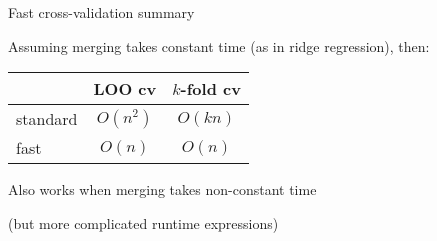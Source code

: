 
\renewcommand{\arraystretch}{1.5}
\begin{frame}{Fast cross-validation summary}
\begin{center}

    Assuming merging takes constant time (as in ridge regression), then:
    \vspace{0.30in}

%
\begin{tabular}{l|cc}
& LOO cv & $k$-fold cv \\
\hline
standard & $O(n^2)$ & $O(kn)$ \\
fast & $O(n)$ & $O(n)$ \\
\end{tabular}

\vspace{0.3in}
Also works when merging takes non-constant time

(but more complicated runtime expressions)



\end{center}
\end{frame}
